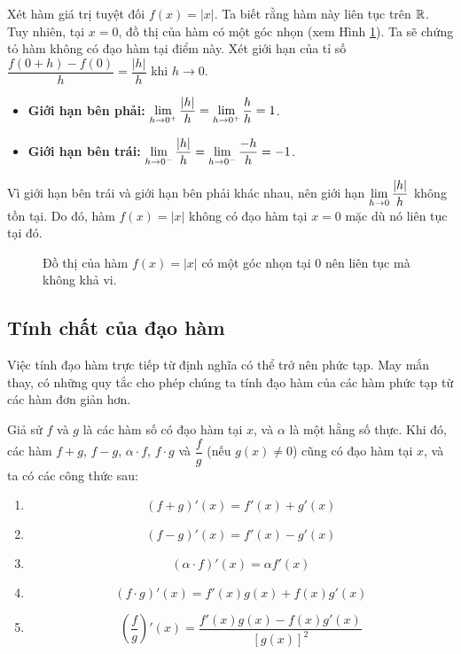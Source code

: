 \begin{example}
Xét hàm giá trị tuyệt đối $f(x) = |x|$.
Ta biết rằng hàm này liên tục trên $\mathbb{R}$. Tuy nhiên, tại $x=0$, đồ thị của hàm có một góc nhọn (xem Hình \ref{fig:abs_value_graph}). Ta sẽ chứng tỏ hàm không có đạo hàm tại điểm này.
Xét giới hạn của tỉ số $\dfrac{f(0+h) - f(0)}{h} = \dfrac{|h|}{h}$ khi $h \to 0$.
\begin{itemize}
    \item \textbf{Giới hạn bên phải:} $\lim\limits_{h \to 0^+} \dfrac{|h|}{h} = \lim\limits_{h \to 0^+} \dfrac{h}{h} = 1$.
    \item \textbf{Giới hạn bên trái:} $\lim\limits_{h \to 0^-} \dfrac{|h|}{h} = \lim\limits_{h \to 0^-} \dfrac{-h}{h} = -1$.
\end{itemize}
Vì giới hạn bên trái và giới hạn bên phải khác nhau, nên giới hạn $\lim\limits_{h \to 0} \dfrac{|h|}{h}$ không tồn tại. Do đó, hàm $f(x)=|x|$ không có đạo hàm tại $x=0$ mặc dù nó liên tục tại đó.
\end{example}

\begin{figure}[H]
    \centering
    \caption{\centering Đồ thị của hàm $f(x)=|x|$ có một góc nhọn tại 0 nên liên tục mà không khả vi.}
    \label{fig:abs_value_graph}
\end{figure}

\subsection{Tính chất của đạo hàm}

Việc tính đạo hàm trực tiếp từ định nghĩa có thể trở nên phức tạp. May mắn thay, có những quy tắc cho phép chúng ta tính đạo hàm của các hàm phức tạp từ các hàm đơn giản hơn.

\begin{theorem}
Giả sử $f$ và $g$ là các hàm số có đạo hàm tại $x$, và $\alpha$ là một hằng số thực. Khi đó, các hàm $f+g$, $f-g$, $\alpha \cdot f$, $f \cdot g$ và $\dfrac{f}{g}$ (nếu $g(x) \neq 0$) cũng có đạo hàm tại $x$, và ta có các công thức sau:
\begin{enumerate}[label=(\alph*)]
    \item \[(f+g)'(x) = f'(x) + g'(x)\]
    \item \[(f-g)'(x) = f'(x) - g'(x)\]
    \item \[(\alpha \cdot f)'(x) = \alpha f'(x)\]
    \item \[(f \cdot g)'(x) = f'(x)g(x) + f(x)g'(x)\]
    \item \[\left(\dfrac{f}{g}\right)'(x) = \dfrac{f'(x)g(x) - f(x)g'(x)}{[g(x)]^2}\]
\end{enumerate}
\end{theorem}

